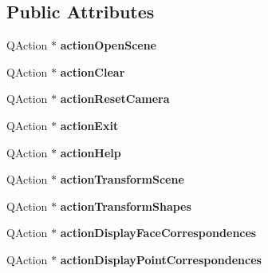 \subsection*{Public Attributes}
\begin{DoxyCompactItemize}
\item 
\hypertarget{class_ui___shape_analyzer_ae008c8eedc0c7c718c6616115550811a}{}Q\+Action $\ast$ {\bfseries action\+Open\+Scene}\label{class_ui___shape_analyzer_ae008c8eedc0c7c718c6616115550811a}

\item 
\hypertarget{class_ui___shape_analyzer_a792d81cf582d4987de7698525cc6a691}{}Q\+Action $\ast$ {\bfseries action\+Clear}\label{class_ui___shape_analyzer_a792d81cf582d4987de7698525cc6a691}

\item 
\hypertarget{class_ui___shape_analyzer_ad3114a8a1304f76bcab84455519e35c7}{}Q\+Action $\ast$ {\bfseries action\+Reset\+Camera}\label{class_ui___shape_analyzer_ad3114a8a1304f76bcab84455519e35c7}

\item 
\hypertarget{class_ui___shape_analyzer_aa3e10a9d2153c566e045b74b13cd68a9}{}Q\+Action $\ast$ {\bfseries action\+Exit}\label{class_ui___shape_analyzer_aa3e10a9d2153c566e045b74b13cd68a9}

\item 
\hypertarget{class_ui___shape_analyzer_acc8b5d83c06140a6d38c0d4bf8804d6f}{}Q\+Action $\ast$ {\bfseries action\+Help}\label{class_ui___shape_analyzer_acc8b5d83c06140a6d38c0d4bf8804d6f}

\item 
\hypertarget{class_ui___shape_analyzer_a98ecadb4c6658834745ee938c33b212d}{}Q\+Action $\ast$ {\bfseries action\+Transform\+Scene}\label{class_ui___shape_analyzer_a98ecadb4c6658834745ee938c33b212d}

\item 
\hypertarget{class_ui___shape_analyzer_ae056264f92a207c5a6a170740c035c43}{}Q\+Action $\ast$ {\bfseries action\+Transform\+Shapes}\label{class_ui___shape_analyzer_ae056264f92a207c5a6a170740c035c43}

\item 
\hypertarget{class_ui___shape_analyzer_a603518c21944cfd0784ec6e6e8206d64}{}Q\+Action $\ast$ {\bfseries action\+Display\+Face\+Correspondences}\label{class_ui___shape_analyzer_a603518c21944cfd0784ec6e6e8206d64}

\item 
\hypertarget{class_ui___shape_analyzer_abfcd88c2533b10d338b6a0c625d06ed7}{}Q\+Action $\ast$ {\bfseries action\+Display\+Point\+Correspondences}\label{class_ui___shape_analyzer_abfcd88c2533b10d338b6a0c625d06ed7}


\end{DoxyCompactItemize}
